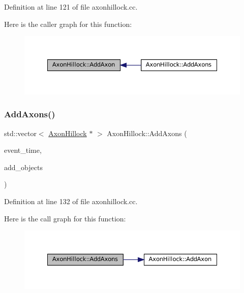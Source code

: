 Definition at line 121 of file axonhillock.\+cc.

Here is the caller graph for this function\+:\nopagebreak
\begin{figure}[H]
\begin{center}
\leavevmode
\includegraphics[width=350pt]{class_axon_hillock_a02bfbaea9ea7a160933f8500c8b41d6a_icgraph}
\end{center}
\end{figure}
\mbox{\label{class_axon_hillock_a54a82227b96757f1c0d7450df6a3df37}} 
\subsubsection{\texorpdfstring{Add\+Axons()}{AddAxons()}}
{\footnotesize\ttfamily std\+::vector$<$ \mbox{\hyperlink{class_axon_hillock}{Axon\+Hillock}} $\ast$ $>$ Axon\+Hillock\+::\+Add\+Axons (\begin{DoxyParamCaption}\item[{std\+::chrono\+::time\+\_\+point$<$ \mbox{\hyperlink{universe_8h_a0ef8d951d1ca5ab3cfaf7ab4c7a6fd80}{Clock}} $>$}]{event\+\_\+time,  }\item[{std\+::vector$<$ \mbox{\hyperlink{class_axon_hillock}{Axon\+Hillock}} $\ast$$>$}]{add\+\_\+objects }\end{DoxyParamCaption})}



Definition at line 132 of file axonhillock.\+cc.

Here is the call graph for this function\+:\nopagebreak
\begin{figure}[H]
\begin{center}
\leavevmode
\includegraphics[width=350pt]{class_axon_hillock_a54a82227b96757f1c0d7450df6a3df37_cgraph}
\end{center}
\end{figure}
\mbox{\label{class_axon_hillock_ad54833cee03cfcacb5e88d174048aaa4}} 
